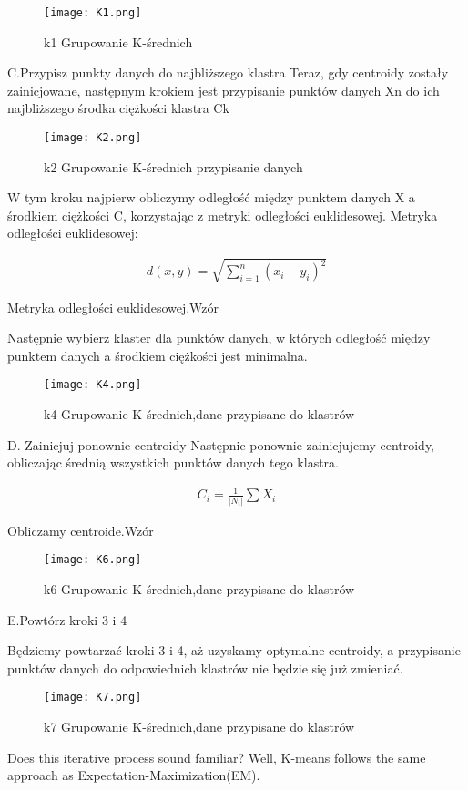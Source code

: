 \begin{figure}[h!]
    \label{fig:k1}
    \centering \texttt{[image: K1.png]}
    \caption{k1 Grupowanie K-średnich\cite{clust2020}}
\end{figure}
 \newpage
 C.Przypisz punkty danych do najbliższego klastra
Teraz, gdy centroidy zostały zainicjowane, następnym krokiem jest przypisanie punktów danych Xn do ich najbliższego środka ciężkości klastra Ck
\begin{figure}[!h]
    \label{fig:k2}
    \centering \texttt{[image: K2.png]}
    \caption{k2 Grupowanie K-średnich przypisanie danych\cite{clust2020}}
\end{figure}

W tym kroku najpierw obliczymy odległość między punktem danych X a środkiem ciężkości C, korzystając z metryki odległości euklidesowej.
Metryka odległości euklidesowej:

\begin{align*}
d(x, y) = \sqrt{\sum_{i=1}^{n} (x_i - y_i)^2}
\end{align*}

Metryka odległości euklidesowej.Wzór\cite{clust2020}


Następnie wybierz klaster dla punktów danych, w których odległość między punktem danych a środkiem ciężkości jest minimalna.
\begin{figure}[h!]
    \label{fig:k4}
    \centering \texttt{[image: K4.png]}
    \caption{k4 Grupowanie K-średnich,dane przypisane do klastrów\cite{clust2020}}
\end{figure}
  
    D.  Zainicjuj ponownie centroidy
Następnie ponownie zainicjujemy centroidy, obliczając średnią wszystkich punktów danych tego klastra.


\begin{align*}
C_i = \frac{1}{\lvert N_i \rvert} \sum X_i
\end{align*}

Obliczamy centroide.Wzór\cite{clust2020}


\begin{figure}[!h]
    \label{fig:k6}
    \centering \texttt{[image: K6.png]}
    \caption{k6 Grupowanie K-średnich,dane przypisane do klastrów\cite{clust2020}}
\end{figure}
\newpage
     E.Powtórz kroki 3 i 4

Będziemy powtarzać kroki 3 i 4, aż uzyskamy optymalne centroidy, a przypisanie punktów danych do odpowiednich klastrów nie będzie się już zmieniać.
\begin{figure}[!h]
    \label{fig:k7}
    \centering \texttt{[image: K7.png]}
    \caption{k7 Grupowanie K-średnich,dane przypisane do klastrów\cite{clust2020}}
\end{figure}

Does this iterative process sound familiar? Well, K-means follows the same approach as Expectation-Maximization(EM). \cite{clust2020}

\newpage


